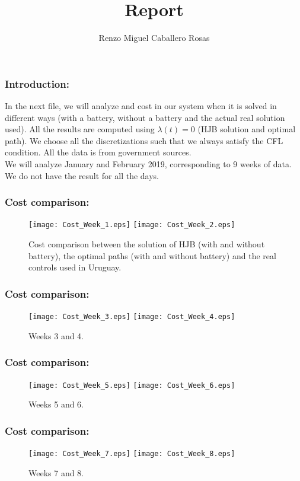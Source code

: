 \documentclass[aspectratio=169]{beamer}\usepackage[utf8]{inputenc}
\title{Report}
\subtitle{Renzo Miguel Caballero Rosas}
\begin{document}
\begin{frame}
\titlepage
\end{frame}

\begin{frame}\frametitle{Introduction:}
In the next file, we will analyze and cost in our system when it is solved in different ways (with a battery, without a battery and the actual real solution used). All the results are computed using $\lambda(t)=0$ (HJB solution and optimal path). We choose all the discretizations such that we always satisfy the CFL condition. All the data is from government sources.\\
We will analyze January and February 2019, corresponding to 9 weeks of data. We do not have the result for all the days.
\end{frame}

\begin{frame}\frametitle{Cost comparison:}
\graphicspath{{./Historical/}}
\begin{figure}[h!]
\centering
\texttt{[image: Cost\_Week\_1.eps]}
\texttt{[image: Cost\_Week\_2.eps]}
\caption{Cost comparison between the solution of HJB (with and without battery), the optimal paths (with and without battery) and the real controls used in Uruguay.}
\end{figure}
\end{frame}

\begin{frame}\frametitle{Cost comparison:}
\graphicspath{{./Historical/}}
\begin{figure}[h!]
\centering
\texttt{[image: Cost\_Week\_3.eps]}
\texttt{[image: Cost\_Week\_4.eps]}
\caption{Weeks 3 and 4.}
\end{figure}
\end{frame}

\begin{frame}\frametitle{Cost comparison:}
\graphicspath{{./Historical/}}
\begin{figure}[h!]
\centering
\texttt{[image: Cost\_Week\_5.eps]}
\texttt{[image: Cost\_Week\_6.eps]}
\caption{Weeks 5 and 6.}
\end{figure}
\end{frame}

\begin{frame}\frametitle{Cost comparison:}
\graphicspath{{./Historical/}}
\begin{figure}[h!]
\centering
\texttt{[image: Cost\_Week\_7.eps]}
\texttt{[image: Cost\_Week\_8.eps]}
\caption{Weeks 7 and 8.}
\end{figure}
\end{frame}
\end{document}
